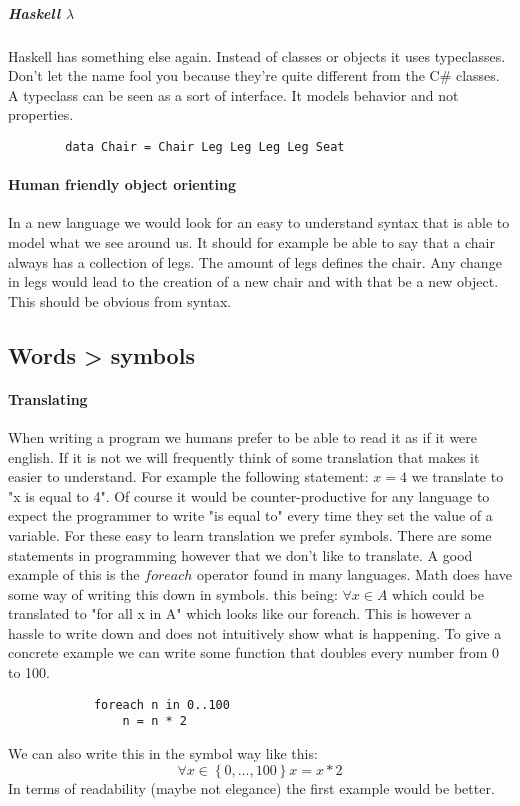 \documentclass{scrartcl}
\begin{document}
    \subparagraph{Haskell $\lambda$}
    Haskell has something else again. Instead of classes or objects it uses
    typeclasses. Don't let the name fool you because they're quite different from
    the C\# classes. A typeclass can be seen as a sort of interface. It models
    behavior and not properties.
    \begin{lstlisting}
        data Chair = Chair Leg Leg Leg Leg Seat
    \end{lstlisting}

    \paragraph{Human friendly object orienting}
    In a new language we would look for an easy to understand syntax that is
    able to model what we see around us. It should for example be able to
    say that a chair always has a collection of legs. The amount of legs
    defines the chair. Any change in legs would lead to the creation of a new
    chair and with that be a new object. This should be obvious from syntax.

    \subsection{Words > symbols}
    \paragraph{Translating}
    When writing a program we humans prefer to be able to read it as if it were
    english. If it is not we will frequently think of some translation that makes
    it easier to understand. For example the following statement: $x = 4$ we
    translate to "x is equal to 4". Of course it would be counter-productive for
    any language to expect the programmer to write "is equal to" every time they
    set the value of a variable. For these easy to learn translation we prefer
    symbols. There are some statements in programming however that we don't like
    to translate. A good example of this is the $foreach$ operator found in many
    languages. Math does have some way of writing this down in symbols. this being:
    $\forall x \in A$ which could be translated to "for all x in A" which looks
    like our foreach. This is however a hassle to write down and does not intuitively
    show what is happening. To give a concrete example we can write some function
    that doubles every number from 0 to 100.
        \begin{lstlisting}
            foreach n in 0..100
                n = n * 2
        \end{lstlisting}
    We can also write this in the symbol way like this:
    \begin{equation*}
        \forall x \in \left\{ 0,...,100 \right\} x = x * 2
    \end{equation*}
    In terms of readability (maybe not elegance) the first example would be better.
\end{document}
